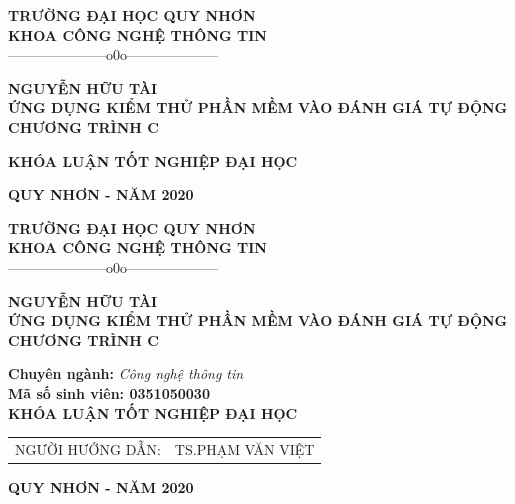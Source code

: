 \documentclass[12pt,a4paper]{report}
\author{Huu Tai}
\begin{document}
\fontsize{13pt}{18pt}\selectfont

\begin{titlepage} %

\begin{center}

{\large\bf TRƯỜNG ĐẠI HỌC QUY NHƠN}\\

{\large\bf KHOA CÔNG NGHỆ THÔNG TIN} \\

{———————o0o——————–}

\vskip 4cm

{\large\bf  NGUYỄN HỮU TÀI}\\[2cm]

{\Large\bf \textbf{ỨNG DỤNG KIỂM THỬ PHẦN MỀM VÀO ĐÁNH GIÁ TỰ ĐỘNG CHƯƠNG TRÌNH C}}\\

\vskip 2cm

{\large\bf KHÓA LUẬN TỐT NGHIỆP ĐẠI HỌC}\\[1cm]

\vskip 5cm

\vfill

{\bf QUY NHƠN - NĂM 2020}

\end{center}

\end{titlepage}

\begin{titlepage} %

\begin{center}

{\large\bf TRƯỜNG ĐẠI HỌC QUY NHƠN}\\

{\large\bf KHOA CÔNG NGHỆ THÔNG TIN} \\

{———————o0o——————–}

\vskip 4cm

{\large\bf  NGUYỄN HỮU TÀI}\\[2cm]

{\Large\bf \textbf{ỨNG DỤNG KIỂM THỬ PHẦN MỀM VÀO ĐÁNH GIÁ TỰ ĐỘNG CHƯƠNG TRÌNH C}}\\

\vskip 3cm

{{\bf Chuyên ngành:} {\it Công nghệ thông tin}}\\
{{\bf Mã số sinh viên: 0351050030}}\\[1cm]

{\bf KHÓA LUẬN TỐT NGHIỆP ĐẠI HỌC}\\[1cm]

\vskip 2cm

\begin{tabular}{r l}
NGƯỜI HƯỚNG DẪN:&  TS.PHẠM VĂN VIỆT\\[0.5cm]

\end{tabular}

\vfill

{\bf QUY NHƠN - NĂM 2020}

\end{center}

\end{titlepage}
\end{document}
